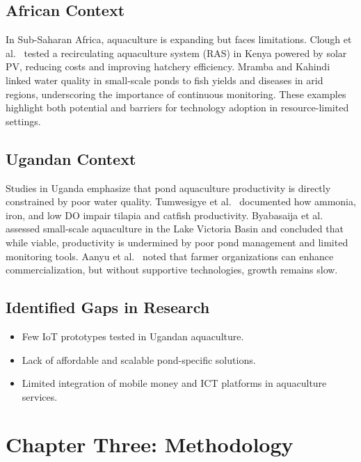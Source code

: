 \documentclass[12pt,a4paper]{report}
\begin{document}
\section{African Context}
In Sub-Saharan Africa, aquaculture is expanding but faces limitations. Clough et al.~\cite{clough2020innovative} tested a recirculating aquaculture system (RAS) in Kenya powered by solar PV, reducing costs and improving hatchery efficiency. Mramba and Kahindi~\cite{mramba2023pond} linked water quality in small-scale ponds to fish yields and diseases in arid regions, underscoring the importance of continuous monitoring. These examples highlight both potential and barriers for technology adoption in resource-limited settings.  

\section{Ugandan Context}
Studies in Uganda emphasize that pond aquaculture productivity is directly constrained by poor water quality. Tumwesigye et al.~\cite{tumwesigye2022effect} documented how ammonia, iron, and low DO impair tilapia and catfish productivity. Byabasaija et al.~\cite{byabasaija2025unlocking} assessed small-scale aquaculture in the Lake Victoria Basin and concluded that while viable, productivity is undermined by poor pond management and limited monitoring tools. Aanyu et al.~\cite{aanyu2020potential} noted that farmer organizations can enhance commercialization, but without supportive technologies, growth remains slow.  

\section{Identified Gaps in Research}
\begin{itemize}
    \item Few IoT prototypes tested in Ugandan aquaculture.
    \item Lack of affordable and scalable pond-specific solutions.
    \item Limited integration of mobile money and ICT platforms in aquaculture services.
\end{itemize}

\chapter{Chapter Three: Methodology}
\end{document}
